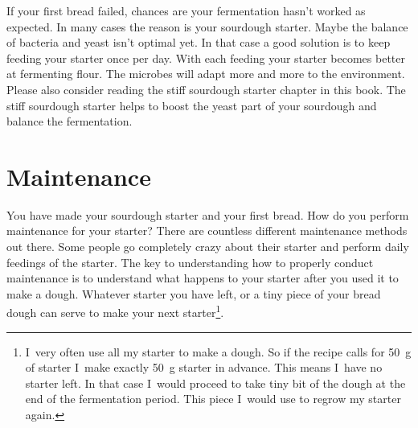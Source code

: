 If your first bread failed, chances are your fermentation hasn't
worked as expected. In many cases the reason is your sourdough starter. Maybe
the balance of bacteria and yeast isn't optimal yet. In that case a good
solution is to keep feeding your starter once per day. With each feeding your
starter becomes better at fermenting flour. The microbes will adapt more and
more to the environment. Please also consider reading the stiff sourdough starter
chapter in this book. The stiff sourdough starter helps to boost the
yeast part of your sourdough and balance the fermentation.

\section{Maintenance}

\begin{flowchart}[!htb]
\centering
  
  \caption[Sourdough starter maintenance flowchart]{A full flowchart showing
      you how to conduct proper sourdough starter maintenance. You can use a
      piece of your dough as the next starter. You can also use left-over
      starter and feed it again. Choose an option that works best for your own
      schedule. The chart assumes that you are using a starter at a
      \qty{100}{\percent} hydration level. Adjust the water content
      accordingly when you use a stiff starter.}%
  \label{fig:sourdough-maintenance-process}
\end{flowchart}

You have made your sourdough starter and your first bread. How do you perform
maintenance for your starter? There are countless different maintenance
methods out there. Some people go completely crazy about their starter and
perform daily feedings of the starter. The key to understanding how to properly
conduct maintenance is to understand what happens to your starter after you
used it to make a dough. Whatever starter you have left, or a tiny piece of
your bread dough can serve to make your next starter\footnote{I~very often use all my
starter to make a dough. So if the recipe calls for \qty{50}{\gram} of starter I~make
exactly \qty{50}{\gram} starter in advance. This means I~have no starter left. In that
case I~would proceed to take tiny bit of the dough at the end of the
fermentation period. This piece I~would use to regrow my starter again.}.

